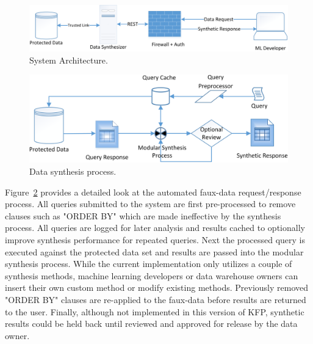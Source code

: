 \documentclass{article}
\begin{document}
\begin{figure}[ht]
  \centering
  \includegraphics[width=\textwidth]{prototype_architecture}
  \caption{System Architecture.}
  \label{fig:architecture}
\end{figure}

\begin{figure}[ht]
  \centering
  \includegraphics[width=120mm]{data_synthesis_process}
  \caption{Data synthesis process.}
  \label{fig:synthesis_process}
\end{figure}

Figure~\ref{fig:synthesis_process} provides a detailed look at the automated faux-data request/response process. All queries submitted to the system are first pre-processed to remove clauses such as "ORDER BY" which are made ineffective by the synthesis process. All queries are logged for later analysis and results cached to optionally improve synthesis performance for repeated queries. Next the processed query is executed against the protected data set and results are passed into the modular synthesis process. While the current implementation only utilizes a couple of synthesis methods, machine learning developers or data warehouse owners can insert their own custom method or modify existing methods. Previously removed "ORDER BY" clauses are re-applied to the faux-data before results are returned to the user. Finally, although not implemented in this version of KFP, synthetic results could be held back until reviewed and approved for release by the data owner.
\end{document}
